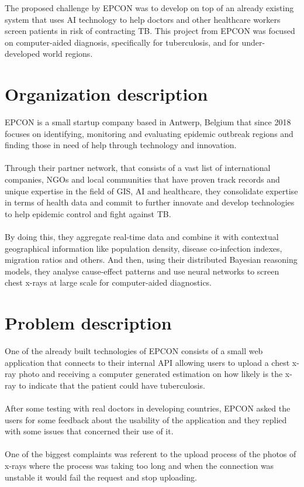 

The proposed challenge by EPCON was to develop on top of an already existing system that uses AI technology to help doctors and other healthcare workers screen patients in risk of contracting TB. This project from EPCON was focused on computer-aided diagnosis, specifically for tuberculosis, and for under-developed world regions.

\section{Organization description}

EPCON is a small startup company based in Antwerp, Belgium that since 2018 focuses on identifying, monitoring and evaluating epidemic outbreak regions and finding those in need of help through technology and innovation.
\\ \\
Through their partner network, that consists of a vast list of international companies, NGOs and local communities that have proven track records and unique expertise in the field of GIS, AI and healthcare, they consolidate expertise in terms of health data and commit to further innovate and develop technologies to help epidemic control and fight against TB.
\\ \\
By doing this, they aggregate real-time data and combine it with contextual geographical information like population density, disease co-infection indexes, migration ratios and others. And then, using their distributed Bayesian reasoning models, they analyse cause-effect patterns and use neural networks to screen chest x-rays at large scale for computer-aided diagnostics. \cite{EPCON}

\section{Problem description}

One of the already built technologies of EPCON consists of a small web application that connects to their internal API allowing users to upload a chest x-ray photo and receiving a computer generated estimation on how likely is the x-ray to indicate that the patient could have tuberculosis.
\\ \\
After some testing with real doctors in developing countries, EPCON asked the users for some feedback about the usability of the application and they replied with some issues that concerned their use of it.
\\ \\
One of the biggest complaints was referent to the upload process of the photos of x-rays where the process was taking too long and when the connection was unstable it would fail the request and stop uploading.


